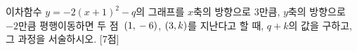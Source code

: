 이차함수 $y=-2(x+1)^2-q$의 그래프를 $x$축의 방향으로 $3$만큼, $y$축의 방향으로 $-2$만큼 평행이동하면 두 점~$(1{,}\mkern3mu -6)$, $(3{,}\mkern3mu k)$를 지난다고 할 때, $q+k$의 값을 구하고, 그 과정을 서술하시오.  \mbox{[7점]}
